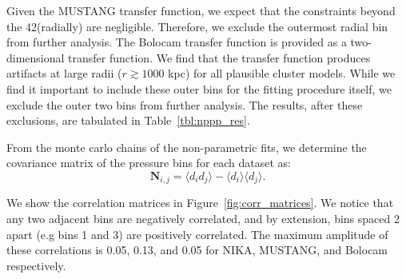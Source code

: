 \documentclass[twocolumn,traditabstract]{aa}
\begin{document}
Given the MUSTANG transfer function, we expect that the constraints beyond the 42\asecs (radially) are negligible. Therefore,
we exclude the outermost radial bin from further analysis.
The Bolocam transfer function is provided as a two-dimensional transfer function. We find that the transfer function produces
artifacts at large radii ($r \gtrsim 1000$ kpc) for all plausible cluster models. While we find it important to include these
outer bins for the fitting procedure itself, we exclude the outer two bins from further analysis. The results, after these
exclusions, are tabulated in Table~\ref{tbl:nppp_res}.



From the monte carlo chains of the non-parametric fits, we determine the covariance matrix of the pressure bins for each dataset as:
\begin{equation}
  \mathbf{N}_{i,j} = \langle d_i d_j \rangle - \langle d_i \rangle \langle d_j \rangle.
  \label{eqn:covariance}
\end{equation}

We show the correlation matrices in Figure~\ref{fig:corr_matrices}. We notice
    that any two adjacent bins are negatively correlated, and by extension, bins spaced 2 apart (e.g bins 1 and 3) are positively
    correlated. The maximum amplitude of these correlations is 0.05, 0.13, and 0.05 for NIKA, MUSTANG, and Bolocam respectively.
\end{document}
